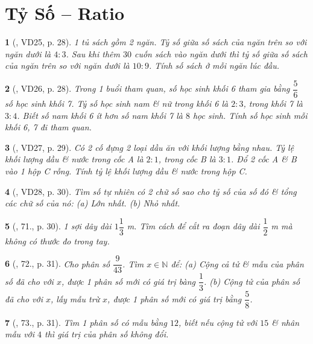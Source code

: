 \documentclass{article}
\newtheorem{baitoan}{}
\begin{document}
\section{Tỷ Số -- Ratio}

\begin{baitoan}[\cite{Binh_Toan_6_tap_2}, VD25, p. 28]
	1 tủ sách gồm 2 ngăn. Tỷ số giữa số sách của ngăn trên so với ngăn dưới là $4:3$. Sau khi thêm $30$ cuốn sách vào ngăn dưới thì tỷ số giữa số sách của ngăn trên so với ngăn dưới là $10:9$. Tính số sách ở mỗi ngăn lúc đầu.
\end{baitoan}

\begin{baitoan}[\cite{Binh_Toan_6_tap_2}, VD26, p. 28]
	Trong 1 buổi tham quan, số học sinh khối 6 tham gia bằng $\dfrac{5}{6}$ số học sinh khối 7. Tỷ số học sinh nam \& nữ trong khối 6 là $2:3$, trong khối 7 là $3:4$. Biết số nam khối 6 ít hơn số nam khối 7 là $8$ học sinh. Tính số học sinh mỗi khối 6, 7 đi tham quan.
\end{baitoan}

\begin{baitoan}[\cite{Binh_Toan_6_tap_2}, VD27, p. 29]
	Có 2 cố đựng 2 loại dầu ăn với khối lượng bằng nhau. Tỷ lệ khối lượng dầu \& nước trong cốc A là $2:1$, trong cốc B là $3:1$. Đổ 2 cốc A \& B vào 1 hộp C rỗng. Tính tỷ lệ khối lượng dầu \& nước trong hộp C.
\end{baitoan}

\begin{baitoan}[\cite{Binh_Toan_6_tap_2}, VD28, p. 30]
	Tìm số tự nhiên có 2 chữ số sao cho tỷ số của số đó \& tổng các chữ số của nó: (a) Lớn nhất. (b) Nhỏ nhất.
\end{baitoan}

\begin{baitoan}[\cite{Binh_Toan_6_tap_2}, 71., p. 30]
	1 sợi dây dài $1\dfrac{1}{3}$ {\rm m}. Tìm cách để cắt ra đoạn dây dài $\dfrac{1}{2}$ {\rm m} mà không có thước đo trong tay.
\end{baitoan}

\begin{baitoan}[\cite{Binh_Toan_6_tap_2}, 72., p. 31]
	Cho phân số $\dfrac{9}{43}$. Tìm $x\in\mathbb{N}$ để: (a) Cộng cả tử \& mẫu của phân số đã cho với $x$, được 1 phân số mới có giá trị bàng $\dfrac{1}{3}$. (b) Cộng tử của phân số đã cho với $x$, lấy mẫu trừ $x$, được 1 phân số mới có giá trị bằng $\dfrac{5}{8}$.
\end{baitoan}

\begin{baitoan}[\cite{Binh_Toan_6_tap_2}, 73., p. 31]
	Tìm 1 phân số có mẫu bằng $12$, biết nếu cộng tử với $15$ \& nhân mẫu với $4$ thì giá trị của phân số không đổi.
\end{baitoan}
\end{document}
